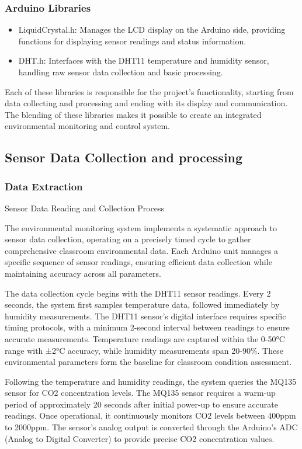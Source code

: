 \subsubsection{Arduino Libraries}
\begin{itemize}
    \item LiquidCrystal.h: Manages the LCD display on the Arduino side, providing functions for displaying sensor readings and status information.
    \item DHT.h: Interfaces with the DHT11 temperature and humidity sensor, handling raw sensor data collection and basic processing.
\end{itemize}
Each of these libraries is responsible for the project's functionality, starting from data collecting and processing and ending with its display and communication. The blending of these libraries makes it possible to create an integrated environmental monitoring and control system.

\subsection{Sensor Data Collection and processing}
\subsubsection{Data Extraction}
Sensor Data Reading and Collection Process

The environmental monitoring system implements a systematic approach to sensor data collection, operating on a precisely timed cycle to gather comprehensive classroom environmental data. Each Arduino unit manages a specific sequence of sensor readings, ensuring efficient data collection while maintaining accuracy across all parameters.

The data collection cycle begins with the DHT11 sensor readings. Every 2 seconds, the system first samples temperature data, followed immediately by humidity measurements. The DHT11 sensor's digital interface requires specific timing protocols, with a minimum 2-second interval between readings to ensure accurate measurements. Temperature readings are captured within the 0-50°C range with ±2°C accuracy, while humidity measurements span 20-90\%. These environmental parameters form the baseline for classroom condition assessment.

Following the temperature and humidity readings, the system queries the MQ135 sensor for CO2 concentration levels. The MQ135 sensor requires a warm-up period of approximately 20 seconds after initial power-up to ensure accurate readings. Once operational, it continuously monitors CO2 levels between 400ppm to 2000ppm. The sensor's analog output is converted through the Arduino's ADC (Analog to Digital Converter) to provide precise CO2 concentration values.

